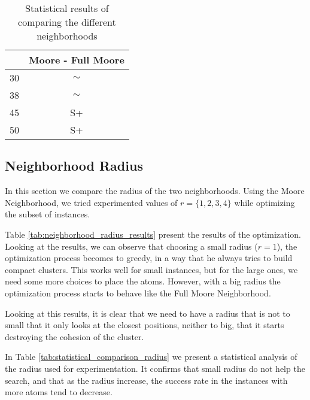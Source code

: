 		\begin{table}[!htdp]
				\begin{center}
					\begin{tabular}{| c | c |}
						\hline
						~ & \textbf{Moore - Full Moore} \\ \hline
						30 & $\sim$ \\ \hline
						38 & $\sim$ \\ \hline
						45 & S+ \\ \hline
						50 & S+ \\ \hline
					\end{tabular}
					\caption{Statistical results of comparing the different neighborhoods}
					\label{tab:statistical_comparison_neighborhoods}
				\end{center}
		\end{table}
		
		
		\subsection{Neighborhood Radius}
		
		In this section we compare the radius of the two neighborhoods. Using the Moore Neighborhood, we tried experimented values of $r = \{1, 2, 3, 4\}$ while optimizing the subset of instances.
		
		Table \ref{tab:neighborhood_radius_results} present the results of the optimization. Looking at the results, we can observe that choosing a small radius ($r=1$), the optimization process becomes to greedy, in a way that he always tries to build compact clusters. This works well for small instances, but for the large ones, we need some more choices to place the atoms. However, with a big radius the optimization process starts to behave like the Full Moore Neighborhood. 
		
		Looking at this results, it is clear that we need to have a radius that is not to small that it only looks at the closest positions, neither to big, that it starts destroying the cohesion of the cluster.
		
		In Table \ref{tab:statistical_comparison_radius} we present a statistical analysis of the radius used for experimentation. It confirms that small radius do not help the search, and that as the radius increase, the success rate in the instances with more atoms tend to decrease.
		
